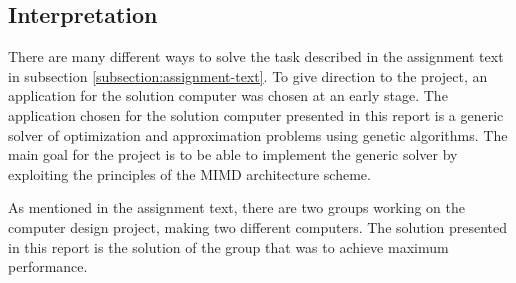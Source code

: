 \subsection{Interpretation}

There are many different ways to solve the task described in the assignment text in subsection \vref{subsection:assignment-text}.
To give direction to the project, an application for the solution computer was chosen at an early stage.
The application chosen for the solution computer presented in this report is a generic solver of optimization and approximation problems using genetic algorithms.
The main goal for the project is to be able to implement the generic solver by exploiting the principles of the MIMD architecture scheme.

As mentioned in the assignment text, there are two groups working on the computer design project, making two different computers.
The solution presented in this report is the solution of the group that was to achieve maximum performance.
